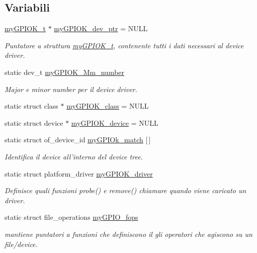 \subsection*{Variabili}
\begin{DoxyCompactItemize}
\item 
\hyperlink{structmy_g_p_i_o_k__t}{my\+G\+P\+I\+O\+K\+\_\+t} $\ast$ \hyperlink{group___kernel-_module_gae370dfc26b06b6cc24a7bcc152f4969e}{my\+G\+P\+I\+O\+K\+\_\+dev\+\_\+ptr} = N\+U\+L\+L
\begin{DoxyCompactList}\small\item\em Puntatore a struttura \hyperlink{structmy_g_p_i_o_k__t}{my\+G\+P\+I\+O\+K\+\_\+t}, contenente tutti i dati necessari al device driver. \end{DoxyCompactList}\item 
static dev\+\_\+t \hyperlink{group___kernel-_module_ga434e034e4625b1949f0c626823870a39}{my\+G\+P\+I\+O\+K\+\_\+\+Mm\+\_\+number}
\begin{DoxyCompactList}\small\item\em Major e minor number per il device driver. \end{DoxyCompactList}\item 
static struct class $\ast$ \hyperlink{group___kernel-_module_gaaf8d1bce7d6389684a037e94381c275c}{my\+G\+P\+I\+O\+K\+\_\+class} = N\+U\+L\+L
\item 
static struct device $\ast$ \hyperlink{group___kernel-_module_ga2d345c792760e3103059b6b6e0bfdaee}{my\+G\+P\+I\+O\+K\+\_\+device} = N\+U\+L\+L
\item 
static struct of\+\_\+device\+\_\+id \hyperlink{group___kernel-_module_ga91f28437e0a553effa546d16fa44f03a}{my\+G\+P\+I\+Ok\+\_\+match} \mbox{[}$\,$\mbox{]}
\begin{DoxyCompactList}\small\item\em Identifica il device all'interno del device tree. \end{DoxyCompactList}\item 
static struct platform\+\_\+driver \hyperlink{group___kernel-_module_ga8dba1541b58fa63f8208232ffce4fc47}{my\+G\+P\+I\+O\+K\+\_\+driver}
\begin{DoxyCompactList}\small\item\em Definisce quali funzioni probe() e remove() chiamare quando viene caricato un driver. \end{DoxyCompactList}\item 
static struct file\+\_\+operations \hyperlink{group___kernel-_module_ga9f31111fdb3b4a5944e18d45045e0f01}{my\+G\+P\+I\+O\+\_\+fops}
\begin{DoxyCompactList}\small\item\em mantiene puntatori a funzioni che definiscono il gli operatori che agiscono su un file/device. \end{DoxyCompactList}\end{DoxyCompactItemize}


